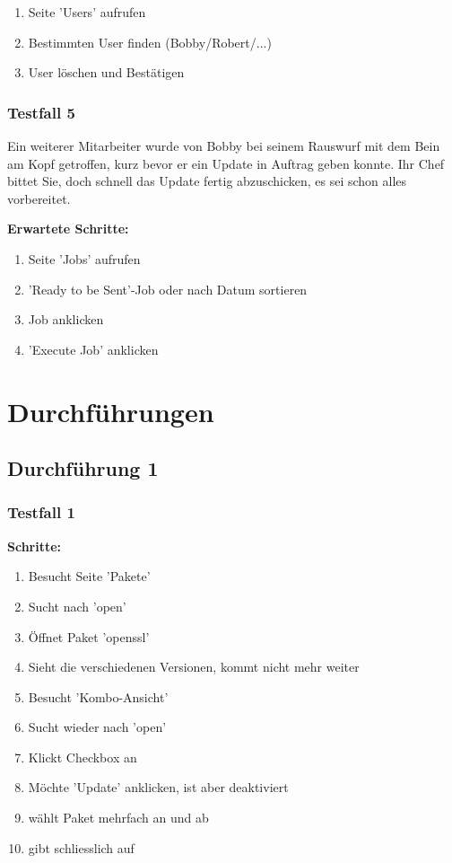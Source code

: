 \begin{enumerate}
    \item Seite 'Users' aufrufen
    \item Bestimmten User finden (Bobby/Robert/...)
    \item User löschen und Bestätigen
\end{enumerate}


\subsubsection*{Testfall 5}

Ein weiterer Mitarbeiter wurde von Bobby bei seinem Rauswurf mit dem Bein am Kopf getroffen, kurz bevor er ein Update in Auftrag geben konnte. Ihr Chef bittet Sie, doch schnell das Update fertig abzuschicken, es sei schon alles vorbereitet.

\bigskip
\textbf{Erwartete Schritte:}

\begin{enumerate}
    \item Seite 'Jobs' aufrufen
    \item 'Ready to be Sent'-Job oder nach Datum sortieren
    \item Job anklicken
    \item 'Execute Job' anklicken
\end{enumerate}





\section*{Durchführungen}



\subsection*{Durchführung 1}

\xxx

\subsubsection*{Testfall 1}

\textbf{Schritte:}

\begin{enumerate}
    \item Besucht Seite 'Pakete'
    \item Sucht nach 'open'
    \item Öffnet Paket 'openssl'
    \item Sieht die verschiedenen Versionen, kommt nicht mehr weiter
    \item Besucht 'Kombo-Ansicht'
    \item Sucht wieder nach 'open'
    \item Klickt Checkbox an
    \item Möchte 'Update' anklicken, ist aber deaktiviert
    \item wählt Paket mehrfach an und ab
    \item gibt schliesslich auf
\end{enumerate}

